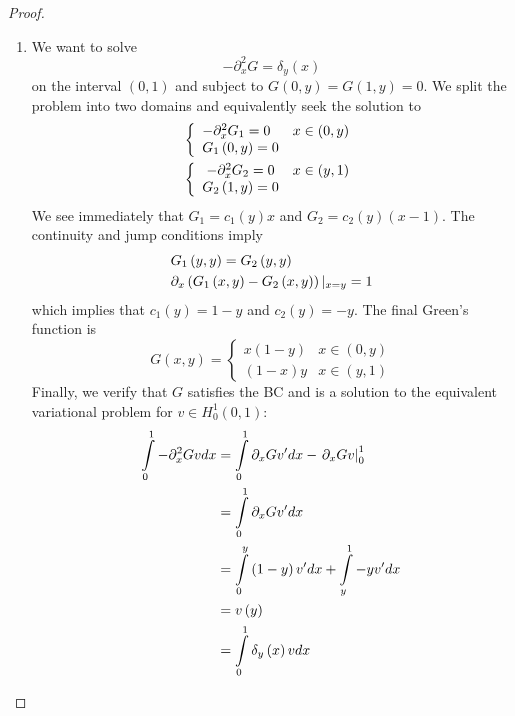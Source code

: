 \documentclass[letterpaper,twoside,11pt]{article}
\theoremstyle{mystyle}
\newcommand{\cblu}{\color{blue}}
\begin{document}
\cblu
\begin{proof}
  \begin{enumerate}
    \item We want to solve \[ - \partial _x^2G = {\delta _y}\left( x \right)\]
    on the interval $(0,1)$ and subject to $G\left( {0,y} \right) = G\left( {1,y} \right) = 0$. We split the problem into two domains and equivalently seek the solution to 
    \[\begin{gathered}
      \left\{ {\begin{array}{*{20}{l}}
      { - \partial _x^2{G_1} = 0}&{x \in \left( {0,y} \right)} \\ 
      {{G_1}\left( {0,y} \right) = 0}&{} 
    \end{array}} \right. \hfill \\
      \left\{ {\begin{array}{*{20}{c}}
      { - \partial _x^2{G_2} = 0}&{x \in \left( {y,1} \right)} \\ 
      {{G_2}\left( {1,y} \right) = 0}&{} 
    \end{array}} \right. \hfill \\ 
    \end{gathered} \]
    We see immediately that $G_1 = c_1(y)x$ and $G_2 = c_2(y)(x-1)$. The continuity and jump conditions imply 
    \[\begin{gathered}
      {G_1}\left( {y,y} \right) = {G_2}\left( {y,y} \right) \hfill \\
      {\partial _x}\left( {{G_1}\left( {x,y} \right) - {G_2}\left( {x,y} \right)} \right){|_{x = y}} = 1 \hfill \\ 
    \end{gathered} \]
    which implies that $c_1(y) = 1-y$ and $c_2(y) = -y$. The final Green's function is 
    \[G\left( {x,y} \right) = \left\{ {\begin{array}{*{20}{c}}
      {x\left( {1 - y} \right)}&{x \in \left( {0,y} \right)} \\ 
      {\left( {1 - x} \right)y}&{x \in \left( {y,1} \right)} 
    \end{array}} \right.\]
    Finally, we verify that $G$ satisfies the BC and is a solution to the equivalent variational problem for $v \in H_0^1 (0,1)$: 
    \begin{align*}
        \int\limits_0^1 { - \partial _x^2Gvdx}  &= \int\limits_0^1 {{\partial _x}Gv'dx}  - \left. {{\partial _x}Gv} \right|_0^1 \hfill \\
         &= \int\limits_0^1 {{\partial _x}Gv'dx}  \hfill \\
         &= \int\limits_0^y {\left( {1 - y} \right)v'dx}  + \int\limits_y^1 { - yv'dx}  \hfill \\
         &= v\left( y \right) \hfill \\
         &= \int\limits_0^1 {{\delta _y}\left( x \right)vdx} 
    \end{align*}





\end{enumerate}
\end{proof}
\end{document}
